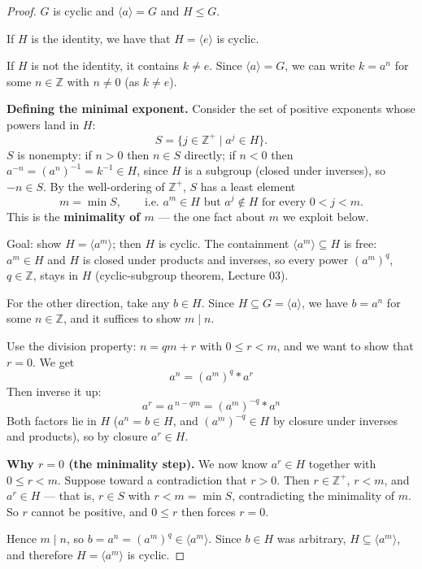 \documentclass[11pt]{article}
\newcommand{\1}{\mathbf{1}}
\theoremstyle{notestyle}
\theoremstyle{definition}
\begin{document}
\begin{proof}
$G$ is cyclic and $\langle a \rangle = G$ and $H \le G.$
\par If $H$ is the identity, we have that $H = \langle e\rangle$ is cyclic.
\par If $H$ is not the identity, it contains $k \ne e$. Since $\langle a \rangle = G$,
we can write $k = a^{n}$ for some $n \in \mathbb{Z}$ with $n \ne 0$ (as $k \ne e$).
\par \textbf{Defining the minimal exponent.} Consider the set of positive exponents
whose powers land in $H$:
$$S = \{j \in \mathbb{Z}^{+} \mid a^{j} \in H\}.$$
$S$ is nonempty: if $n > 0$ then $n \in S$ directly; if $n < 0$ then
$a^{-n} = (a^{n})^{-1} = k^{-1} \in H$, since $H$ is a subgroup (closed under
inverses), so $-n \in S$. By the well-ordering of $\mathbb{Z}^{+}$, $S$ has a least
element
$$m = \min S, \qquad \text{i.e. } a^{m} \in H \text{ but } a^{j} \notin H \text{ for every } 0 < j < m.$$
This is the \textbf{minimality of $m$} — the one fact about $m$ we exploit below.
\par Goal: show $H = \langle a^{m}\rangle$; then $H$ is cyclic. The containment
$\langle a^{m}\rangle \subseteq H$ is free: $a^{m} \in H$ and $H$ is closed under
products and inverses, so every power $(a^{m})^{q}$, $q \in \mathbb{Z}$, stays in $H$
(cyclic-subgroup theorem, Lecture 03).
\par For the other direction, take any $b \in H$. Since $H \subseteq G = \langle a
\rangle$, we have $b = a^{n}$ for some $n \in \mathbb{Z}$, and it suffices to show
$m \mid n$.
\par Use the division property: $n = qm + r$ with $0 \le r < m$, and we want to show
that $r = 0$.
We get $$a^n = (a^m)^q * a^r$$
Then inverse it up:
$$a^{r} = a^{\,n - qm} = (a^{m})^{-q} * a^{n}$$
Both factors lie in $H$ ($a^{n} = b \in H$, and $(a^{m})^{-q} \in H$ by closure under
inverses and products), so by closure $a^{r} \in H$.
\par \textbf{Why $r = 0$ (the minimality step).} We now know $a^{r} \in H$ together
with $0 \le r < m$. Suppose toward a contradiction that $r > 0$. Then $r \in
\mathbb{Z}^{+}$, $r < m$, and $a^{r} \in H$ — that is, $r \in S$ with
$r < m = \min S$, contradicting the minimality of $m$. So $r$ cannot be positive, and
$0 \le r$ then forces $r = 0$.
\par Hence $m \mid n$, so $b = a^{n} = (a^{m})^{q} \in \langle a^{m} \rangle$. Since
$b \in H$ was arbitrary, $H \subseteq \langle a^{m} \rangle$, and therefore
$H = \langle a^{m} \rangle$ is cyclic.
\end{proof}
\end{document}
